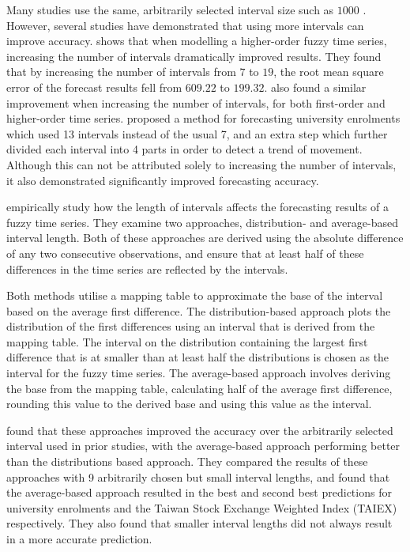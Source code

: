 \documentclass{article}
\theoremstyle{definition}
\begin{document}
Many studies use the same, arbitrarily selected interval size such as $1000$ \citep{song1993forecasting, song1994forecasting, chen1996forecasting, tsai2000forecasting, chen2004new}. However, several studies have demonstrated that using more intervals can improve accuracy. \citep{tsai2000forecasting} shows that when modelling a higher-order fuzzy time series, increasing the number of intervals dramatically improved results. They found that by increasing the number of intervals from $7$ to $19$, the root mean square error of the forecast results fell from $609.22$ to $199.32$. \cite{tsai1999study} also found a similar improvement when increasing the number of intervals, for both first-order and higher-order time series. \cite{chen2004new} proposed a method for forecasting university enrolments which used 13 intervals instead of the usual 7, and an extra step which further divided each interval into 4 parts in order to detect a trend of movement. Although this can not be attributed solely to increasing the number of intervals, it also demonstrated significantly improved forecasting accuracy. 	

\cite{Huarng2001effective} empirically study how the length of intervals affects the forecasting results of a fuzzy time series. They examine two approaches, distribution- and average-based interval length. Both of these approaches are derived using the absolute difference of any two consecutive observations, and ensure that at least half of these differences in the time series are reflected by the intervals. 

Both methods utilise a mapping table to approximate the base of the interval based on the average first difference. The distribution-based approach plots the distribution of the first differences using an interval that is derived from the mapping table. The interval on the distribution containing the largest first difference that is at smaller than at least half the distributions is chosen as the interval for the fuzzy time series. The average-based approach involves deriving the base from the mapping table, calculating half of the average first difference, rounding this value to the derived base and using this value as the interval.

\cite{Huarng2001effective} found that these approaches improved the accuracy over the arbitrarily selected interval used in prior studies, with the average-based approach performing better than the distributions based approach. They compared the results of these approaches with 9 arbitrarily chosen but small interval lengths, and found that the average-based approach resulted in the best and second best predictions for university enrolments and the Taiwan Stock Exchange Weighted Index (TAIEX) respectively. They also found that smaller interval lengths did not always result in a more accurate prediction.
\end{document}
